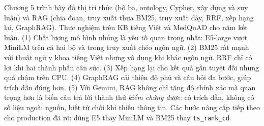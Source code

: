 Chương 5 trình bày đồ thị tri thức (bộ ba, ontology, Cypher, xây dựng và suy luận) và RAG (chia đoạn, truy xuất thưa BM25, truy xuất dày, RRF, xếp hạng lại, GraphRAG). Thực nghiệm trên KB tiếng Việt và MedQuAD cho năm kết luận. (1) Chất lượng mô hình nhúng là yếu tố quan trọng nhất: E5-large vượt MiniLM trên cả hai bộ và trong truy xuất chéo ngôn ngữ. (2) BM25 rất mạnh với thuật ngữ y khoa tiếng Việt nhưng vô dụng khi khác ngôn ngữ. RRF chỉ có lợi khi hai thành phần cân sức. (3) Xếp hạng lại cho kết quả gần tuyệt đối nhưng quá chậm trên CPU. (4) GraphRAG cải thiện độ phủ và câu hỏi đa bước, giúp trích dẫn đúng hơn. (5) Với Gemini, RAG không chỉ tăng độ chính xác mà quan trọng hơn là biến câu trả lời thành thứ \emph{kiểm chứng được}: có trích dẫn, không có số liệu ngoài nguồn, biết từ chối khi thiếu thông tin. Các bước nâng cấp tiếp theo cho production đã rõ: dùng E5 thay MiniLM và BM25 thay \texttt{ts\_rank\_cd}.


